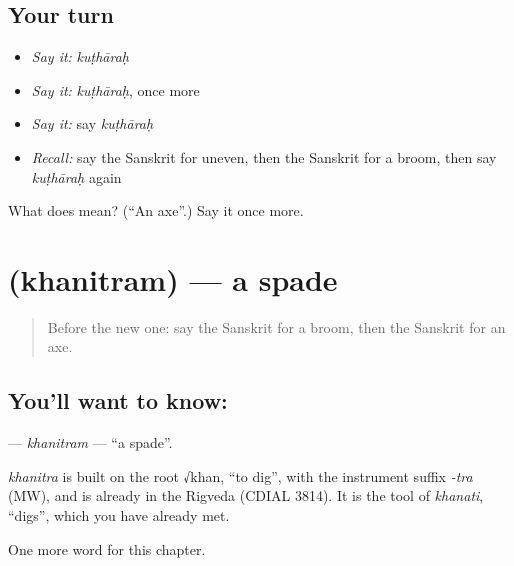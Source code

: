 \subsection*{Your turn}
\begin{itemize}
\raggedright
  \item \emph{Say it:} \emph{kuṭhāraḥ}
  \item \emph{Say it:} \emph{kuṭhāraḥ}, once more
  \item \emph{Say it:} say \emph{kuṭhāraḥ}
  \item \emph{Recall:} say the Sanskrit for uneven, then the Sanskrit for a broom, then say \emph{kuṭhāraḥ} again
\end{itemize}

\begin{tcolorbox}[breakable,colback=teal!4,colframe=teal!35!black,title={Before you move on}]
What does  mean? (\textquotedblleft{}An axe\textquotedblright{}.) Say it once more.
\end{tcolorbox}
\section[\texorpdfstring{\sk{खनित्रम्} (khanitram)}{खनित्रम् (khanitram)}]{ (khanitram) — a spade}

\label{lesson:SA-C218-khanitram}



\begin{quote}
Before the new one: say the Sanskrit for a broom, then the Sanskrit for an axe.
\end{quote}

\subsection*{You'll want to know: }
\textbf{} — \emph{khanitram} — \textquotedblleft{}a spade\textquotedblright{}.

\begin{cousinweb}
\emph{khanitra} is built on the root √khan, \textquotedblleft{}to dig\textquotedblright{}, with the instrument suffix \emph{-tra} (MW), and is already in the Rigveda (CDIAL 3814). It is the tool of \emph{khanati}, \textquotedblleft{}digs\textquotedblright{}, which you have already met.
\end{cousinweb}

\begin{grammarlens}[title={What you've built}]
One more word for this chapter.
\end{grammarlens}

